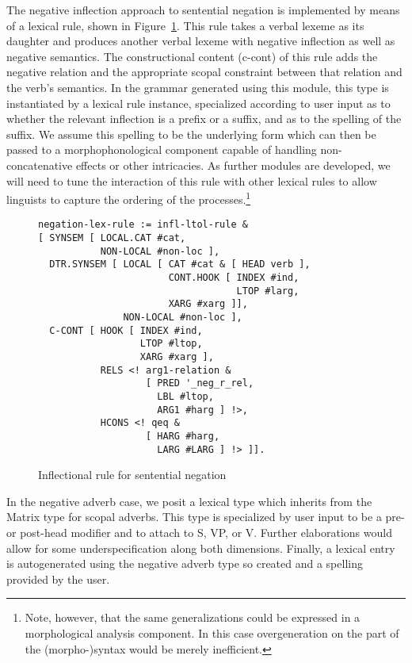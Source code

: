 \documentclass[11pt]{article}
\begin{document}
The negative inflection approach to sentential negation is implemented
by means of a lexical rule, shown in Figure~\ref{negrulefig}.  This
rule takes a verbal lexeme as its daughter and produces another verbal
lexeme with negative inflection as well as negative semantics.  The
constructional content ({\sc c-cont}) of this rule adds the negative
relation and the appropriate scopal constraint between that relation
and the verb's semantics. In the grammar generated using this module,
this type is instantiated by a lexical rule instance, specialized
according to user input as to whether the relevant inflection is a
prefix or a suffix, and as to the spelling of the suffix.  We assume
this spelling to be the underlying form which can then be passed to a
morphophonological component capable of handling non-concatenative
effects or other intricacies.  As further modules are developed, we
will need to tune the interaction of this rule with other lexical
rules to allow linguists to capture the ordering of the
processes.\footnote{Note, however, that the same generalizations could be
expressed in a morphological analysis component.  In this case
overgeneration on the part of the (morpho-)syntax would be merely
inefficient.}

\begin{figure}[ht]
{\scriptsize
\begin{verbatim}
negation-lex-rule := infl-ltol-rule &
[ SYNSEM [ LOCAL.CAT #cat,
           NON-LOCAL #non-loc ],
  DTR.SYNSEM [ LOCAL [ CAT #cat & [ HEAD verb ],
                       CONT.HOOK [ INDEX #ind,
                                   LTOP #larg,
                       XARG #xarg ]],
               NON-LOCAL #non-loc ],
  C-CONT [ HOOK [ INDEX #ind,
                  LTOP #ltop,
                  XARG #xarg ],
           RELS <! arg1-relation &
                   [ PRED '_neg_r_rel,
                     LBL #ltop,
                     ARG1 #harg ] !>,
           HCONS <! qeq &
                   [ HARG #harg,
                     LARG #LARG ] !> ]].
\end{verbatim}
}
\caption{Inflectional rule for sentential negation}
\label{negrulefig}
\end{figure}

In the negative adverb case, we posit a lexical type which inherits
from the Matrix type for scopal adverbs.  This type is specialized by user
input to be a pre- or post-head modifier and to attach to S, VP, or V.  Further
elaborations would allow for some underspecification along both dimensions.
Finally, a lexical entry is autogenerated using the negative adverb type
so created and a spelling provided by the user.
\end{document}
